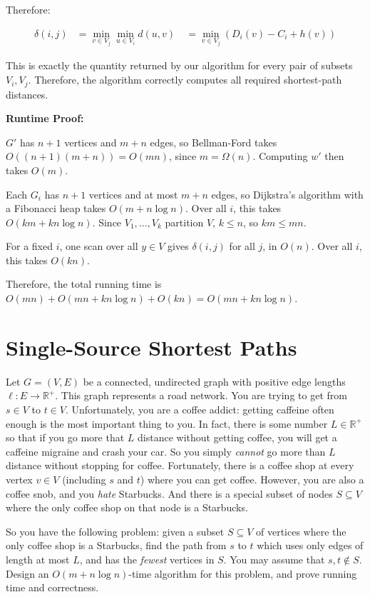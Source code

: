 \documentclass[11pt]{article}
\begin{document}
Therefore:

$$
\begin{aligned}
\delta(i,j)
&=\min_{v\in V_j}\min_{u\in V_i}d(u,v)\
&=\min_{v\in V_j}\left(D_i(v)-C_i+h(v)\right)
\end{aligned}
$$

This is exactly the quantity returned by our algorithm for every pair of subsets $V_i, V_j$. 
Therefore, the algorithm correctly computes all required shortest-path distances.

\bigbreak

\textbf{Runtime Proof:}

$G'$ has $n + 1$ vertices and $m + n$ edges, so Bellman-Ford takes $O((n + 1)(m + n)) = O(mn)$, since $m = \Omega(n)$. Computing $w'$ then takes $O(m)$.

Each $G_i$ has $n + 1$ vertices and at most $m + n$ edges, so Dijkstra’s algorithm with a Fibonacci heap takes $O(m + n \log n)$. 
Over all $i$, this takes $O(km + kn \log n)$. Since $V_1 , \dots, V_k$ partition $V$, $k \leq n$, so $km \leq mn$.

For a fixed $i$, one scan over all $y \in V$ gives $\delta(i, j)$ for all $j$, in $O(n)$. Over all $i$, this takes $O(kn)$.

Therefore, the total running time is $O(mn) + O(mn + kn \log n) + O(kn) = O(mn + kn \log n)$.

\bigbreak

\section{Single-Source Shortest Paths}
Let $G = (V, E)$ be a connected, undirected graph with positive edge lengths $\ell : E \rightarrow \mathbb{R}^+$. This graph represents a road network. 
You are trying to get from $s \in V$ to $t \in V$. Unfortunately, you are a coffee addict: getting caffeine often enough is the most important thing to you. 
In fact, there is some number $L \in \mathbb{R}^+$ so that if you go more that $L$ distance without getting coffee, 
you will get a caffeine migraine and crash your car.  So you simply \emph{cannot} go more than $L$ distance without stopping for coffee. 
Fortunately, there is a coffee shop at every vertex $v \in V$ (including $s$ and $t$) where you can get coffee. 
However, you are also a coffee snob, and you \emph{hate} Starbucks. And there is a special subset of nodes $S \subseteq V$ 
where the only coffee shop on that node is a Starbucks.

So you have the following problem: given a subset $S \subseteq V$ of vertices where the only coffee shop is a Starbucks, 
find the path from $s$ to $t$ which uses only edges of length at most $L$, and has the \emph{fewest} vertices in $S$.  
You may assume that $s,t\not\in S$.  Design an $O(m + n\log n)$-time algorithm for this problem, and prove running time and correctness.
\end{document}
